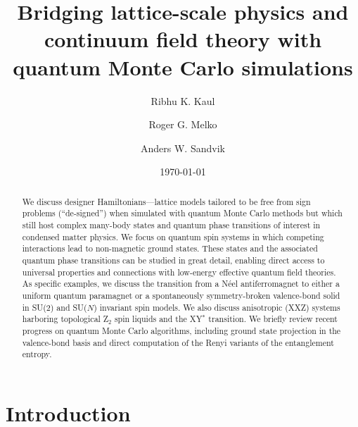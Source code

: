 \documentclass[10pt,pre,aps,twocolumn,showpacs,subscriptaddresses,floatfix]{revtex4}
\begin{document}
\title{Bridging lattice-scale physics and continuum field theory with quantum Monte Carlo simulations} 

\author{Ribhu K. Kaul}

\author{Roger G. Melko}

\author{Anders W. Sandvik}

\begin{abstract}
We discuss designer Hamiltonians---lattice models tailored to be free from sign problems (``de-signed'') when simulated with quantum 
Monte Carlo methods but which still host complex  many-body states and quantum phase transitions of interest in condensed matter 
physics. We focus on quantum spin systems in which competing interactions lead to non-magnetic ground states. These states and the 
associated quantum phase transitions can be studied in great detail, enabling direct access to universal properties and connections 
with low-energy effective quantum field theories. As specific examples, we discuss the transition from a N\'eel antiferromagnet to 
either a uniform quantum paramagnet or a spontaneously symmetry-broken valence-bond solid in SU($2$) and SU($N$) invariant spin models. 
We also discuss anisotropic (XXZ) systems harboring topological Z$_2$ spin liquids and the XY$^*$ transition. We briefly review recent 
progress on quantum Monte Carlo algorithms, including ground state projection in the valence-bond basis and direct computation 
of the Renyi variants of the entanglement entropy.
\end{abstract}

\maketitle

\date{\today}


\section{Introduction}
\label{sec:intro}
\end{document}
